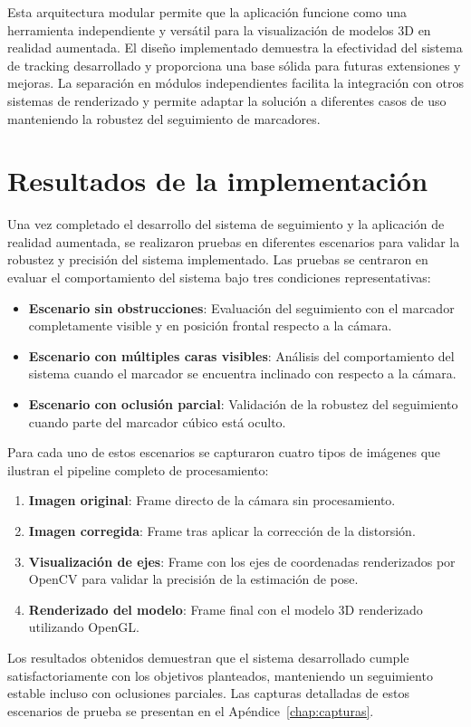Esta arquitectura modular permite que la aplicación funcione como una herramienta independiente y versátil para la visualización de modelos 3D en realidad aumentada. El diseño implementado demuestra la efectividad del sistema de \gls{tracking} desarrollado y proporciona una base sólida para futuras extensiones y mejoras. La separación en módulos independientes facilita la integración con otros sistemas de renderizado y permite adaptar la solución a diferentes casos de uso manteniendo la robustez del seguimiento de marcadores.

\section{Resultados de la implementación}
\label{sec:resultados}

Una vez completado el desarrollo del sistema de seguimiento y la aplicación de realidad aumentada, se realizaron pruebas en diferentes escenarios para validar la robustez y precisión del sistema implementado. Las pruebas se centraron en evaluar el comportamiento del sistema bajo tres condiciones representativas:

\begin{itemize}
	\item \textbf{Escenario sin obstrucciones}: Evaluación del seguimiento con el marcador completamente visible y en posición frontal respecto a la cámara.
	\item \textbf{Escenario con múltiples caras visibles}: Análisis del comportamiento del sistema cuando el marcador se encuentra inclinado con respecto a la cámara.
	\item \textbf{Escenario con oclusión parcial}: Validación de la robustez del seguimiento cuando parte del marcador cúbico está oculto.
\end{itemize}

Para cada uno de estos escenarios se capturaron cuatro tipos de imágenes que ilustran el pipeline completo de procesamiento:

\begin{enumerate}
	\item \textbf{Imagen original}: Frame directo de la cámara sin procesamiento.
	\item \textbf{Imagen corregida}: Frame tras aplicar la corrección de la distorsión.
	\item \textbf{Visualización de ejes}: Frame con los ejes de coordenadas renderizados por OpenCV para validar la precisión de la estimación de pose.
	\item \textbf{Renderizado del modelo}: Frame final con el modelo 3D renderizado utilizando OpenGL.
\end{enumerate}

Los resultados obtenidos demuestran que el sistema desarrollado cumple satisfactoriamente con los objetivos planteados, manteniendo un seguimiento estable incluso con oclusiones parciales. Las capturas detalladas de estos escenarios de prueba se presentan en el Apéndice~\ref{chap:capturas}.


